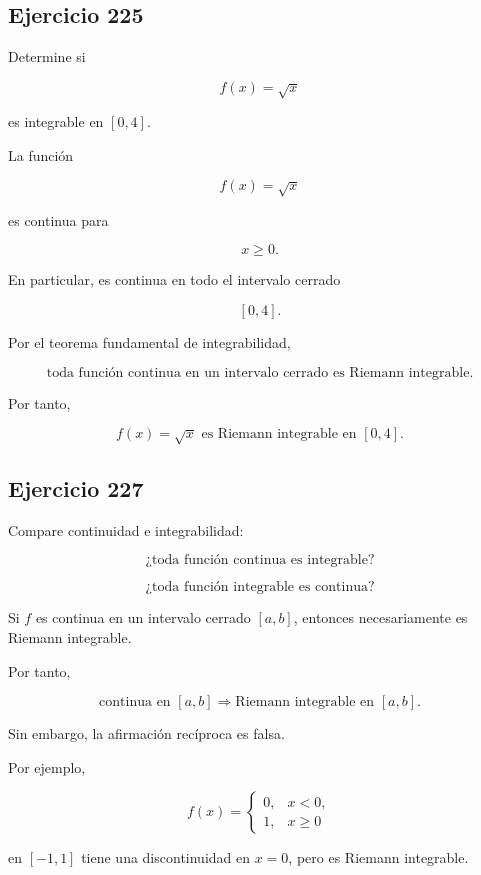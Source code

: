 \documentclass[12pt]{article}
\begin{document}
\subsection*{Ejercicio 225}

Determine si

\[
f(x)=\sqrt{x}
\]

es integrable en \([0,4]\).

La función

\[
f(x)=\sqrt{x}
\]

es continua para

\[
x\geq0.
\]

En particular, es continua en todo el intervalo cerrado

\[
[0,4].
\]

Por el teorema fundamental de integrabilidad,

\[
\boxed{
\text{toda función continua en un intervalo cerrado es Riemann
integrable}
}.
\]

Por tanto,

\[
\boxed{
f(x)=\sqrt{x}
\text{ es Riemann integrable en }[0,4]
}.
\]

\subsection*{Ejercicio 227}

Compare continuidad e integrabilidad:

\[
\text{¿toda función continua es integrable?}
\]

\[
\text{¿toda función integrable es continua?}
\]

Si \(f\) es continua en un intervalo cerrado \([a,b]\), entonces
necesariamente es Riemann integrable.

Por tanto,

\[
\boxed{
\text{continua en }[a,b]
\Longrightarrow
\text{Riemann integrable en }[a,b]
}.
\]

Sin embargo, la afirmación recíproca es falsa.

Por ejemplo,

\[
f(x)=
\begin{cases}
0, & x<0,\\
1, & x\geq0
\end{cases}
\]

en \([-1,1]\) tiene una discontinuidad en \(x=0\), pero es Riemann
integrable.
\end{document}
